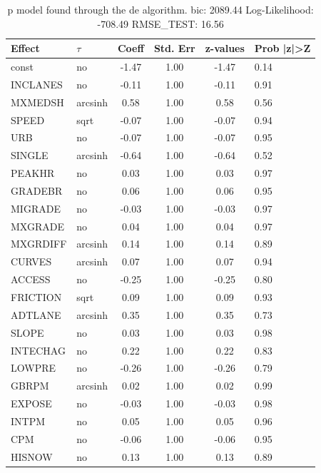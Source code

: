 \begin{table}
	\caption{p model found through the de algorithm. bic: 2089.44 Log-Likelihood: -708.49 RMSE_TEST: 16.56}
	\begin{center}
		\begin{tabular}{|l|l|c|c|c|l|}
			\hline
			Effect & $\tau$ & Coeff & Std. Err & z-values & Prob |z|>Z \\
			\hline
			const & no & -1.47 & 1.00 & -1.47 & 0.14 \\
			\hline
			INCLANES & no & -0.11 & 1.00 & -0.11 & 0.91 \\
			\hline
			MXMEDSH & arcsinh & 0.58 & 1.00 & 0.58 & 0.56 \\
			\hline
			SPEED & sqrt & -0.07 & 1.00 & -0.07 & 0.94 \\
			\hline
			URB & no & -0.07 & 1.00 & -0.07 & 0.95 \\
			\hline
			SINGLE & arcsinh & -0.64 & 1.00 & -0.64 & 0.52 \\
			\hline
			PEAKHR & no & 0.03 & 1.00 & 0.03 & 0.97 \\
			\hline
			GRADEBR & no & 0.06 & 1.00 & 0.06 & 0.95 \\
			\hline
			MIGRADE & no & -0.03 & 1.00 & -0.03 & 0.97 \\
			\hline
			MXGRADE & no & 0.04 & 1.00 & 0.04 & 0.97 \\
			\hline
			MXGRDIFF & arcsinh & 0.14 & 1.00 & 0.14 & 0.89 \\
			\hline
			CURVES & arcsinh & 0.07 & 1.00 & 0.07 & 0.94 \\
			\hline
			ACCESS & no & -0.25 & 1.00 & -0.25 & 0.80 \\
			\hline
			FRICTION & sqrt & 0.09 & 1.00 & 0.09 & 0.93 \\
			\hline
			ADTLANE & arcsinh & 0.35 & 1.00 & 0.35 & 0.73 \\
			\hline
			SLOPE & no & 0.03 & 1.00 & 0.03 & 0.98 \\
			\hline
			INTECHAG & no & 0.22 & 1.00 & 0.22 & 0.83 \\
			\hline
			LOWPRE & no & -0.26 & 1.00 & -0.26 & 0.79 \\
			\hline
			GBRPM & arcsinh & 0.02 & 1.00 & 0.02 & 0.99 \\
			\hline
			EXPOSE & no & -0.03 & 1.00 & -0.03 & 0.98 \\
			\hline
			INTPM & no & 0.05 & 1.00 & 0.05 & 0.96 \\
			\hline
			CPM & no & -0.06 & 1.00 & -0.06 & 0.95 \\
			\hline
			HISNOW & no & 0.13 & 1.00 & 0.13 & 0.89 \\

\end{tabular}
\end{center}
\end{table}
